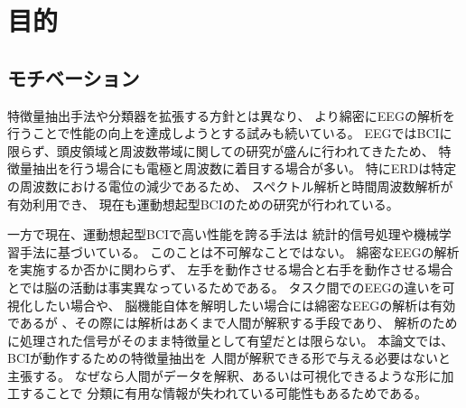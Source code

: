 \section{\mc 目的}
\subsection{\mc モチベーション}
特徴量抽出手法や分類器を拡張する方針とは異なり、
より綿密にEEGの解析を行うことで性能の向上を達成しようとする試みも続いている\cite{脳波解析BCI,脳波分析BCI,ERSBCI}。
EEGではBCIに限らず、頭皮領域と周波数帯域に関しての研究が盛んに行われてきたため、
特徴量抽出を行う場合にも電極と周波数に着目する場合が多い。
特にERDは特定の周波数における電位の減少であるため、
スペクトル解析と時間周波数解析が有効利用でき、
現在も運動想起型BCIのための研究が行われている\cite{時間周波数解析の比較}。

一方で現在、運動想起型BCIで高い性能を誇る手法は
統計的信号処理や機械学習手法に基づいている。
このことは不可解なことではない。
綿密なEEGの解析を実施するか否かに関わらず、
左手を動作させる場合と右手を動作させる場合とでは脳の活動は事実異なっているためである。
タスク間でのEEGの違いを可視化したい場合や、
脳機能自体を解明したい場合には綿密なEEGの解析は有効であるが
、その際には解析はあくまで人間が解釈する手段であり、
解析のために処理された信号がそのまま特徴量として有望だとは限らない。
本論文では、BCIが動作するための特徴量抽出を
人間が解釈できる形で与える必要はないと主張する。
なぜなら人間がデータを解釈、あるいは可視化できるような形に加工することで
分類に有用な情報が失われている可能性もあるためである。

